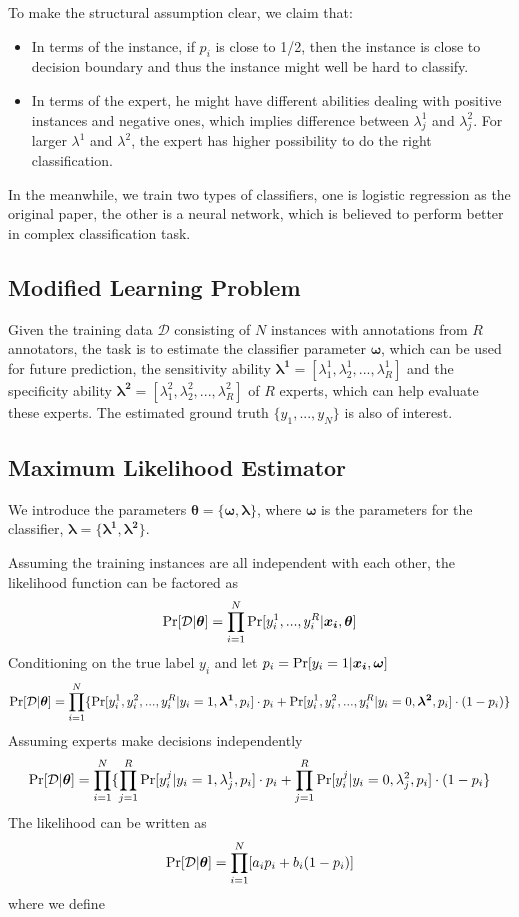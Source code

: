 \documentclass{article}
\begin{document}
To make the structural assumption clear, we claim that:
\begin{itemize}
    \item In terms of the instance, if $p_i$ is close to 1/2, then the instance is close to decision boundary and thus the instance might well be hard to classify.
    \item In terms of the expert, he might have different abilities dealing with positive instances and negative ones, which implies difference between  $\lambda_j^1$ and $\lambda_j^2$. For larger $\lambda^{1}$ and $\lambda^{2}$, the expert has higher possibility to do the right classification.
\end{itemize}

In the meanwhile, we train two types of classifiers, one is logistic regression as the original paper, the other is a neural network, which is believed to perform better in complex classification task.

\subsection{Modified Learning Problem}
Given the training data $\mathcal{D}$ consisting of $N$ instances with annotations from $R$ annotators, the task is to estimate the classifier parameter $\bm{\omega}$, which can be used for future prediction, the sensitivity ability $\bm{\lambda^1}=[\lambda_1^1,\lambda_2^1,...,\lambda_R^1]$ and the specificity ability $\bm{\lambda^2}=[\lambda_1^2,\lambda_2^2,...,\lambda_R^2]$ of $R$ experts, which can help evaluate these experts. The estimated ground truth $\lbrace y_1,...,y_N\rbrace$ is also of interest.

\subsection{Maximum Likelihood Estimator}
We introduce the parameters $\bm{\theta}=\lbrace \bm{\omega,\lambda}\rbrace$, where $\bm{\omega}$ is the parameters for the classifier, $\bm{\lambda=\lbrace\lambda^{1},\lambda^{2}}\rbrace$.

Assuming the training instances are all independent with each other, the likelihood function can be factored as $$\textup{Pr}[\mathcal{D}|\bm{\theta}]=\prod_{i=1}^{N}\textup{Pr}[y_i^1,...,y_i^R|\bm{x_i},\bm{\theta}]$$
Conditioning on the true label $y_i$ and let $p_i=\textup{Pr}[y_i=1|\bm{x_i},\bm{\omega}]$
$$\textup{Pr}[\mathcal{D}|\bm{\theta}]=\prod_{i=1}^{N}\lbrace \textup{Pr}[y_i^1, y_i^2,...,y_i^R|y_i=1,\bm{\lambda^1},p_i]\cdot p_i+ \textup{Pr}[y_i^1,y_i^2,...,y_i^R|y_i=0,\bm{\lambda^2},p_i]\cdot (1-p_i) \rbrace$$
Assuming experts make decisions independently
$$\textup{Pr}[\mathcal{D}|\bm{\theta}]=\prod_{i=1}^{N} \lbrace \prod_{j=1}^{R} \textup{Pr}[y_i^j|y_i=1,\lambda_j^1,p_i]\cdot p_i+\prod_{j=1}^{R}\textup{Pr}[y_i^j|y_i=0,\lambda_j^2,p_i]\cdot (1-p_i \}$$
The likelihood can be written as
$$\textup{Pr}[\mathcal{D}|\bm{\theta}]=\prod_{i=1}^{N}[a_i p_i+b_i (1-p_i)]$$
where we define
\end{document}
